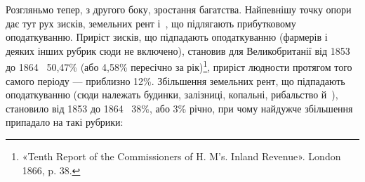 Розгляньмо тепер, з другого боку, зростання багатства. Найпевнішу
точку опори дає тут рух зисків, земельних рент і~,
що підлягають прибутковому оподаткуванню. Приріст зисків, що
підпадають оподаткуванню (фармерів і деяких інших рубрик сюди
не включено), становив для Великобританії від 1853 до 1864~
50,47\% (або 4,58\% пересічно за рік)\footnote{
«Tenth Report of the Commissioners of H. M’s. Inland Revenue».
London 1866, p. 38.
}, приріст людности протягом
того самого періоду — приблизно 12\%. Збільшення земельних
рент, що підпадають оподаткуванню (сюди належать
будинки, залізниці, копальні, рибальство й~), становило
від 1853 до 1864~ 38\%, або 3\% річно, при чому найдужче
збільшення припадало на такі рубрики:
